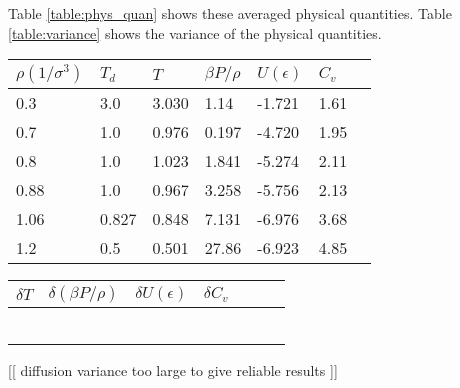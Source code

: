 Table \ref{table:phys_quan} shows these averaged physical quantities. Table \ref{table:variance} shows the variance of the physical quantities.
\begin{center}
\begin{tabular}{lllllll}
\hline \hline
$\rho(1/\sigma^3)$ & $T_d$ & $T$ & $\beta P/\rho$ & $U(\epsilon)$ & $C_v$ \\
\hline
0.3 & 3.0 & 3.030 & 1.14 & -1.721 & 1.61 \\
0.7 & 1.0 & 0.976 & 0.197 & -4.720 & 1.95 \\
0.8 & 1.0 & 1.023 & 1.841 & -5.274 & 2.11 \\
0.88& 1.0 & 0.967 & 3.258 & -5.756 & 2.13 \\
1.06& 0.827&0.848 & 7.131 & -6.976 & 3.68 \\
1.2 & 0.5 & 0.501 & 27.86 & -6.923 & 4.85 \\
\hline \hline
\end{tabular}
\vspace{-0.1cm}
\label{table:phys_quan}
\end{center}

\begin{center}
\begin{tabular}{lllllll}
\hline \hline
 $\delta T$ & $\delta (\beta P/\rho)$ & $\delta U(\epsilon)$ & $\delta C_v$ \\
\hline
  &  &  &  \\
  &  &  &  \\
  &  &  &  \\
  &  &  &  \\
  &  &  &  \\
  &  &  &  \\
\hline \hline
\end{tabular}
\vspace{-0.1cm}
\label{table:variance}
\end{center}

[[ diffusion variance too large to give reliable results ]]
